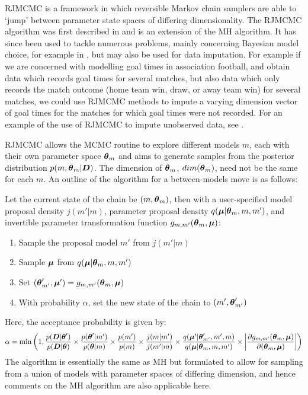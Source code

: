 \gls{RJMCMC} is a framework in which reversible Markov chain samplers are able to `jump' between parameter state spaces
of differing dimensionality. The \gls{RJMCMC} algorithm was first described in \cite{green1995} and is an extension of
the \gls{MH} algorithm. It has since been used to tackle numerous problems, mainly concerning Bayesian model choice, for
example in \cite{hastie2012, punska1999}, but may also be used for data imputation. For example if we are
concerned with modelling goal times in association football, and obtain data which records goal times for several
matches, but also data which only records the match outcome (home team win, draw, or away team win) for several matches,
we could use \gls{RJMCMC} methods to impute a varying dimension vector of goal times for the matches for which goal
times were not recorded. For an example of the use of \gls{RJMCMC} to impute unobserved data, see \cite{gibson1998}.

\gls{RJMCMC} allows the \gls{MCMC} routine to explore different models \(m\), each with their own parameter space
\(\boldsymbol{\theta}_m\) and aims to generate samples from the posterior distribution \(p(m, \boldsymbol{\theta}_m | \boldsymbol{D})\). The
dimension of \(\boldsymbol{\theta}_m\), \(dim(\boldsymbol{\theta}_m)\), need not be the same for each \(m\). An outline of the algorithm
for a between-models move is as follows: 

Let the current state of the chain be \((m, \boldsymbol{\theta}_m)\), then with a user-specified model proposal density \(j(m' |
m)\), parameter proposal density \(q(\boldsymbol{\mu} | \boldsymbol{\theta}_m, m, m')\), and invertible parameter transformation function
\(g_{m, m'}(\boldsymbol{\theta}_m, \boldsymbol{\mu})\):
\begin{enumerate} 
  \item Sample the proposal model \(m'\) from \(j(m' | m)\)
  \item Sample \(\boldsymbol{\mu}\) from \(q(\boldsymbol{\mu} | \boldsymbol{\theta}_m, m, m')\)
  \item Set \((\boldsymbol{\theta}'_{m'}, \boldsymbol{\mu}') = g_{m, m'}(\boldsymbol{\theta}_m, \boldsymbol{\mu})\)
  \item With probability \(\alpha\), set the new state of the chain to \((m', \boldsymbol{\theta}'_{m'})\)
\end{enumerate}
Here, the acceptance probability is given by:
\begin{align} 
\alpha = \min\left(1, 
\frac{p(\boldsymbol{D} | \boldsymbol{\theta}')}{p(\boldsymbol{D} | \boldsymbol{\theta})} \times 
\frac{p(\boldsymbol{\theta}' | m')}{p(\boldsymbol{\theta} | m)} \times
\frac{p(m')}{p(m)} \times 
\frac{j(m | m')}{j(m' | m)} \times 
\frac{q(\boldsymbol{\mu}' | \boldsymbol{\theta}'_{m'}, m', m)}{q(\boldsymbol{\mu} | \boldsymbol{\theta}_m, m, m')} \times 
\left| \frac{\partial g_{m, m'}(\boldsymbol{\theta}_m, \boldsymbol{\mu})}{\partial (\boldsymbol{\theta}_m, \boldsymbol{\mu})} \right| 
\right)
\end{align}
The algorithm is essentially the same as \gls{MH} but formulated to allow for sampling from a union of models with
parameter spaces of differing dimension, and hence comments on the \gls{MH} algorithm are also applicable here.

